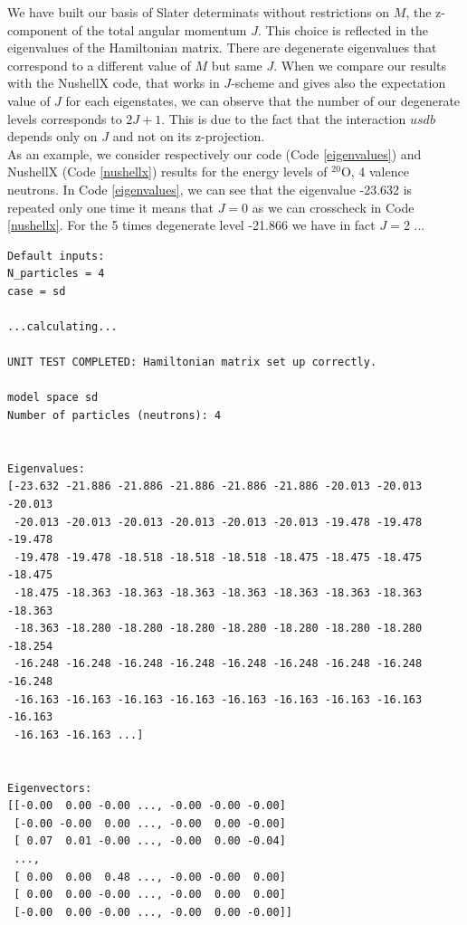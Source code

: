 \documentclass[twoside]{article}
\begin{document}
We have built our basis of Slater determinats without restrictions on $M$, the z-component of the total angular momentum $J$. This choice is reflected in the eigenvalues of the Hamiltonian matrix. There are degenerate eigenvalues that correspond to a different value of $M$ but same $J$. When we compare our results with the NushellX code, that works in $J$-scheme and gives also the expectation value of $J$ for each eigenstates, we can observe that the number of our degenerate levels corresponds to $2J+1$. This is due to the fact that the interaction $usdb$\cite{Brown 2006} depends only on $J$ and not on its z-projection.\\
As an example, we consider respectively our code (Code \ref{eigenvalues}) and NushellX (Code \ref{nushellx}) results for the energy levels of $^{20}$O, 4 valence neutrons. In Code \ref{eigenvalues}, we can see that the eigenvalue -23.632 is repeated only one time it means that $J=0$ as we can crosscheck in Code \ref{nushellx}. For the 5 times degenerate level -21.866 we have in fact $J=2$ ...

\begin{lstlisting}[label=eigenvalues,caption= example of the output from \texttt{main.py} when it is run with default inputs. To be noticed the degenerate eigenvalues.]
Default inputs: 
N_particles = 4 
case = sd 

...calculating...

UNIT TEST COMPLETED: Hamiltonian matrix set up correctly.

model space sd
Number of particles (neutrons): 4


Eigenvalues:
[-23.632 -21.886 -21.886 -21.886 -21.886 -21.886 -20.013 -20.013 -20.013
 -20.013 -20.013 -20.013 -20.013 -20.013 -20.013 -19.478 -19.478 -19.478
 -19.478 -19.478 -18.518 -18.518 -18.518 -18.475 -18.475 -18.475 -18.475
 -18.475 -18.363 -18.363 -18.363 -18.363 -18.363 -18.363 -18.363 -18.363
 -18.363 -18.280 -18.280 -18.280 -18.280 -18.280 -18.280 -18.280 -18.254
 -16.248 -16.248 -16.248 -16.248 -16.248 -16.248 -16.248 -16.248 -16.248
 -16.163 -16.163 -16.163 -16.163 -16.163 -16.163 -16.163 -16.163 -16.163
 -16.163 -16.163 ...]


Eigenvectors:
[[-0.00  0.00 -0.00 ..., -0.00 -0.00 -0.00]
 [-0.00 -0.00  0.00 ..., -0.00  0.00 -0.00]
 [ 0.07  0.01 -0.00 ..., -0.00  0.00 -0.04]
 ..., 
 [ 0.00  0.00  0.48 ..., -0.00 -0.00  0.00]
 [ 0.00  0.00 -0.00 ..., -0.00  0.00  0.00]
 [-0.00  0.00 -0.00 ..., -0.00  0.00 -0.00]]
\end{lstlisting}
\end{document}
